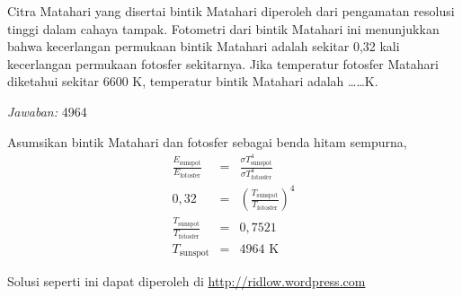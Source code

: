 \documentclass[11pt,fleqn]{exam}
\begin{document}
\begin{questions}
\question Citra Matahari yang disertai bintik Matahari diperoleh dari pengamatan resolusi tinggi dalam cahaya tampak. Fotometri dari bintik Matahari ini menunjukkan bahwa kecerlangan permukaan bintik Matahari adalah sekitar 0,32 kali kecerlangan permukaan fotosfer sekitarnya. Jika temperatur fotosfer Matahari diketahui sekitar 6600 K, temperatur bintik Matahari adalah \ldots\ldots K.

\textit{Jawaban: } 4964

Asumsikan bintik Matahari dan fotosfer sebagai benda hitam sempurna,
\begin{eqnarray*}
\frac{E_\text{sunspot}}{E_\text{fotosfer}} &=& \frac{\sigma T^4_\text{sunspot}}{\sigma T^4_\text{fotosfer}}\\ 
0,32 &=& \left( \frac{T_\text{sunspot}}{T_\text{fotosfer}} \right)^{4}\\
\frac{T_\text{sunspot}}{T_\text{fotosfer}} &=& 0,7521\\
T_\text{sunspot} &=& 4964 \text{ K}
\end{eqnarray*}


\end{questions}


\vspace{2cm}
\begin{flushright}
Solusi seperti ini dapat diperoleh di \url{http://ridlow.wordpress.com}
\end{flushright}
\end{document}
